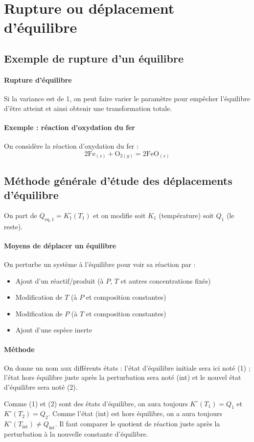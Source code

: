\documentclass[french]{book}
\theoremstyle{plain}
\theoremstyle{definition}
\theoremstyle{remark}
\begin{document}
\section{Rupture ou déplacement d'équilibre}
\subsection{Exemple de rupture d'un équilibre}
\paragraph{Rupture d’équilibre} Si la variance est de 1, on peut faire varier le paramètre pour empêcher l’équilibre d’être atteint et ainsi obtenir une transformation totale.
\paragraph{Exemple : réaction d'oxydation du fer} On considère la réaction d'oxydation du fer : $$2\text{Fe}_{(s)}+\text{O}_{2(g)}=2\text{FeO}_{(s)}$$
\subsection{Méthode générale d'étude des déplacements d'équilibre}
On part de $Q_{\text{eq},1}=K_1^\circ(T_1)$ et on modifie soit $K_1$ (température) soit $Q_1$ (le reste).
\paragraph{Moyens de déplacer un équilibre} On perturbe un système à l’équilibre pour voir sa réaction par :
\begin{itemize}
	\item Ajout d’un réactif/produit (à $P$, $T$ et autres concentrations fixés)
	\item Modification de $T$ (à $P$ et composition constantes)
	\item Modification de $P$ (à $T$ et composition constantes)
	\item Ajout d’une espèce inerte
\end{itemize}
\paragraph{Méthode} On donne un nom aux différents états : l'état d'équilibre initiale sera ici noté (1) ; l'état hors équilibre juste après la perturbation sera noté (int) et le nouvel état d'équilibre sera noté (2). \par Comme (1) et (2) sont des états d'équilibre, on aura toujours $K^\circ(T_1)=Q_1$ et $K^\circ(T_2)=Q_2$. Comme l'état (int) est hors équilibre, on a aura toujours $K^\circ(T_\text{int})\ne Q_\text{int}$. Il faut comparer le quotient de réaction juste après la perturbation à la nouvelle constante d'équilibre.
\end{document}
